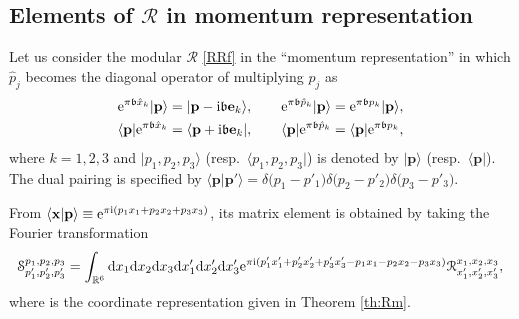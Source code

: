 \documentclass[pdftex]{sigma}
\newcommand{\R}{{\mathbb R}}
\newcommand{\bb}{{\mathfrak b}}
\newcommand{\e}{{\mathrm e}}
\numberwithin{equation}{section}
\begin{document}
\subsection[Elements of R in momentum representation]{Elements of $\boldsymbol{\mathcal{R}}$ in momentum representation}

Let us consider the modular ${\mathcal R}$ \eqref{RRf} in the
``momentum representation'' in which $\hat{p}_j$ becomes the diagonal
operator of multiplying $p_j$ as
\begin{gather}
\e^{\pi \bb \hat{x}_k}|\mathbf{p}\rangle = |\mathbf{p}-{\rm i} \bb \mathbf{e}_k\rangle,
\qquad
\e^{\pi \bb \hat{p}_k}|\mathbf{p}\rangle = \e^{\pi \bb p_k}|\mathbf{p}\rangle,\nonumber
\\
\langle \mathbf{p}|\e^{\pi \bb \hat{x}_k} = \langle \mathbf{p}+{\rm i} \bb \mathbf{e}_k|,
\qquad
\langle \mathbf{p}|\e^{\pi \bb \hat{p}_k} = \langle \mathbf{p}|\e^{\pi \bb p_k},\label{prep}
\end{gather}
where $k=1, 2, 3$ and $|p_1,p_2, p_3\rangle$ (resp.\
$\langle p_1,p_2,p_3|$) is denoted by $|\mathbf{p}\rangle$ (resp.\
$\langle \mathbf{p}|$). The dual pairing is specified by
$\bigl\langle \mathbf{p} | \mathbf{p}'\bigr\rangle =
\delta\bigl(p_1-p'_1\bigr)\delta\bigl(p_2-p'_2\bigr)\delta\bigl(p_3-p'_3\bigr)$.

From $\langle \mathbf{x}|\mathbf{p}\rangle \equiv \e^{\pi {\rm i}(p_1x_1+p_2x_2+p_3x_3)}$,
its matrix element
is obtained by taking the Fourier transformation
\begin{align}\label{ft}
{\mathcal S}^{p_1,p_2,p_3}_{p'_1,p'_2,p'_3} = \int_{\R^6} {\rm d}x_1{\rm d}x_2{\rm d}x_3
{\rm d}x'_1{\rm d}x'_2{\rm d}x'_3
\e^{\pi {\rm i}(p'_1x'_1+p'_2x'_2+p'_3x'_3-p_1x_1-p_2x_2-p_3x_3)}
{\mathcal R}^{x_1,x_2,x_3}_{x'_1,x'_2, x'_3},
\end{align}
where
is the coordinate representation given in Theorem \ref{th:Rm}.
\end{document}
